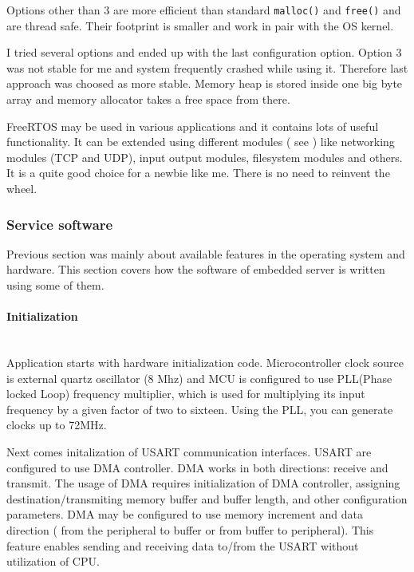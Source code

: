 Options other than 3 are more efficient than standard \texttt{malloc()}
and \texttt{free()} and are thread safe. Their footprint is smaller and work in
pair with the OS kernel. 

I tried several options and ended up with the last configuration option. 
Option 3 was not stable for me and system frequently crashed while using it.
Therefore last approach was choosed as more stable. Memory heap is stored inside
one big byte array and memory allocator takes a free space from there.

FreeRTOS may be used in various applications and it contains lots of useful
functionality. It can be extended using different modules ( see
\cite{FreeRTOS_website}) like networking modules (TCP and UDP), input output
modules, filesystem modules and others. It is a quite good choice for a newbie
like me. There is no need to reinvent the wheel.

\subsubsection{Service software}


Previous section was mainly about available features in the operating system and
hardware. 
This section covers how the software of embedded server is written
using some of them.

\paragraph{Initialization} ~\\
Application starts with hardware initialization code. Microcontroller clock
source is external quartz oscillator (8 Mhz) and MCU is configured to use 
PLL(Phase locked Loop) frequency multiplier,  which is used for multiplying its
input frequency by a given factor of two to sixteen. 
Using the PLL, you can generate clocks up to 72MHz.

Next comes initalization of USART communication interfaces. USART are configured
to use \gls{DMA} controller. \gls{DMA} works in both directions: receive and
transmit. The usage of DMA requires initialization of DMA controller, assigning
destination/transmiting memory buffer and buffer length, and other configuration
parameters. DMA may be configured to use memory increment and data direction (
from the peripheral to buffer or from buffer to peripheral). This feature
enables sending and receiving data to/from the USART without utilization of
CPU.

